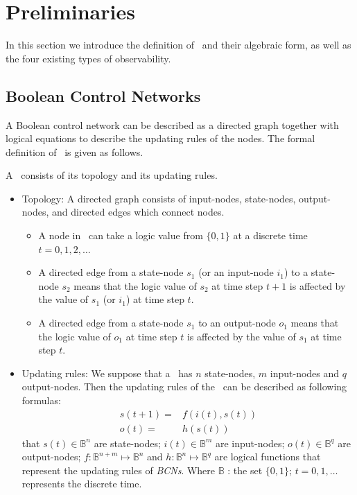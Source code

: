 \section{Preliminaries} 
\label{sec:pre}
In this section we introduce the definition of \BCNs\ and their algebraic form, as well as the four existing types of observability.

\subsection{Boolean Control Networks}

A Boolean control network can be described as a directed graph together with logical equations to describe the updating rules of the nodes. The formal definition of \BCN\ is given as follows. 

\begin{definition} A \BCN\ consists of its topology and its updating rules.\cite{Ideker2001A}
\begin{itemize}
  \item Topology:  A directed graph consists of input-nodes, state-nodes, output-nodes, and directed edges which connect nodes. 
	\begin{itemize}
	\item A node in \BCN\ can take a logic value from $\{0,1\}$ at a discrete time $t=0, 1, 2,\ldots$ 
	
	\item A directed edge from a state-node $s_1$ (or an input-node $i_1$) to a state-node $s_2$ means that the logic value of $s_2$ at time step $t+1$ is affected by the value of $s_1$ (or $i_1$)  at time step $t$. 
	
	\item A directed edge from a state-node $s_1$ to an output-node $o_1$ means that the logic value of $o_1$ at time step $t$ is affected by the value of $s_1$  at time step $t$.  
	\end{itemize}
  \item Updating rules: We suppose that a \BCN\ has $n$ state-nodes, $m$ input-nodes and $q$ output-nodes. Then the updating rules of the \BCN\ can be described as following formulas:
\begin{equation}
\begin{split}
s(t+1)=&f(i(t),s(t))\\
o(t)=&h(s(t))
\end{split}
\label{equ:1}
\end{equation}
that $s(t)\in \mathbb{B}^n$ are state-nodes; $i(t)\in \mathbb{B}^m$ are input-nodes; $o(t)\in \mathbb{B}^q$ are output-nodes; $f:\mathbb{B}^{n+m}\mapsto \mathbb{B}^n$ and $h:\mathbb{B}^n\mapsto \mathbb{B}^q$ are logical functions that represent the updating rules of {\em BCNs}. Where $\mathbb{B}$ : the set $\{0,1\}$; $t=0,1,\ldots$ represents the discrete time. 
\end{itemize}

\end{definition}



